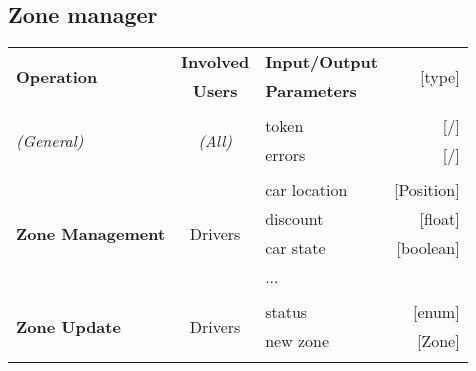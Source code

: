 \subsection{Zone manager}
	\begin{center}
		\begin{tabular}{ l | c | l   r }
			\multirow{2}{*}{\textbf{Operation}} & \textbf{Involved} & \textbf{Input/Output} & \multirow{2}{*}{[type]}\\
			& \textbf{Users} & \textbf{Parameters} & \\ [1.5ex]
			\hline\hline\\
			
			\multirow{2}{*}{\textit{(General)}}
				& \multirow{2}{*}{\textit{(All)}}
					&	token & [/]\\
					&&	errors & [/]\\ [1.5ex]
			\hline\\
			
			\multirow{4}{*}{\textbf{Zone Management}}
				& \multirow{4}{*}{Drivers}
					&	car location & [Position]\\
					&&	discount & [float]\\
					&&	car state & [boolean]\\
					&&	... & \\ [1.5ex]
			\hline\\
			
			\multirow{2}{*}{\textbf{Zone Update}}
				& \multirow{2}{*}{Drivers}
					&	status & [enum]\\
					&&	new zone  & [Zone]\\ [1.5ex]
			\hline\\

		\end{tabular}
	\end{center}

